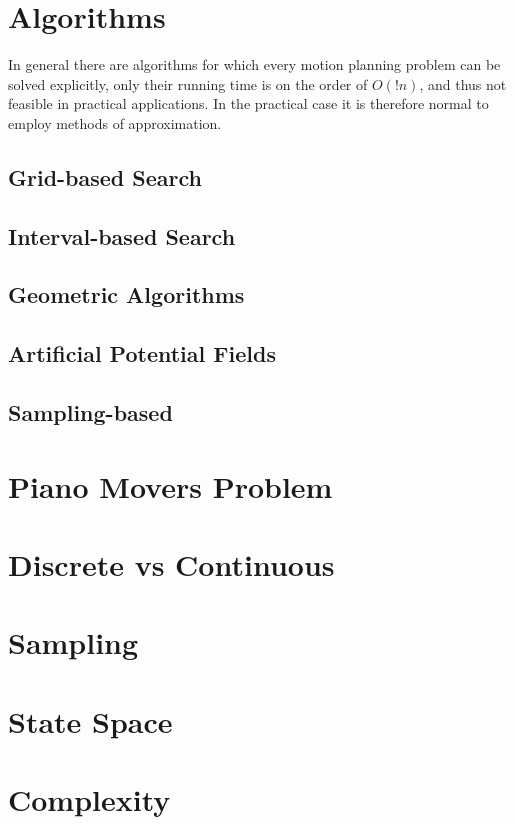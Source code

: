\section{Algorithms}
In general there are algorithms for which every motion planning problem can be
solved explicitly, only their running time is on the order of \(O(!n)\), and
thus not feasible in practical applications. In the practical case it is
therefore normal to employ methods of approximation.

\subsection{Grid-based Search}

\subsection{Interval-based Search}

\subsection{Geometric Algorithms}

\subsection{Artificial Potential Fields}

\subsection{Sampling-based}

\section{Piano Movers Problem}

\section{Discrete vs Continuous}

\section{Sampling}

\section{State Space}

\section{Complexity}

